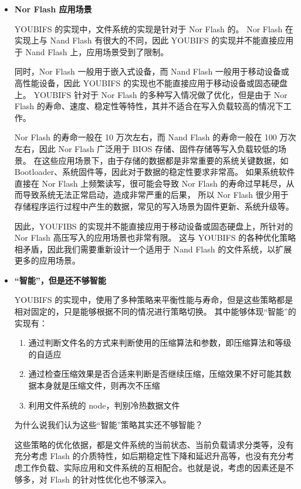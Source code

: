 \begin{itemize}
  \item {\bf{Nor Flash 应用场景}}
    
  YOUBIFS 的实现中，文件系统的实现是针对于 Nor Flash 的。
  Nor Flash 在实现上与 Nand Flash 有很大的不同，因此 YOUBIFS 的实现并不能直接应用于 Nand Flash 上，应用场景受到了限制。
  
  同时，Nor Flash 一般用于嵌入式设备，而 Nand Flash 一般用于移动设备或高性能设备，因此 YOUBIFS 的实现也不能直接应用于移动设备或固态硬盘上。
  YOUBIFS 针对于 Nor Flash 的多种写入情况做了优化，但是由于 Nor Flash 的寿命、速度、稳定性等特性，其并不适合在写入负载较高的情况下工作。

  Nor Flash 的寿命一般在 10 万次左右，而 Nand Flash 的寿命一般在 100 万次左右，因此 Nor Flash 广泛用于 BIOS 存储、固件存储等写入负载较低的场景。
  在这些应用场景下，由于存储的数据都是非常重要的系统关键数据，如 Bootloader、系统固件等，因此对于数据的稳定性要求非常高。
  如果系统软件直接在 Nor Flash 上频繁读写，很可能会导致 Nor Flash 的寿命过早耗尽，从而导致系统无法正常启动，造成非常严重的后果，
  所以 Nor Flash 很少用于存储程序运行过程中产生的数据，常见的写入场景为固件更新、系统升级等。

  因此，YOUFIBS 的实现并不能直接应用于移动设备或固态硬盘上，所针对的 Nor Flash 高压写入的应用场景也非常有限。
  这与 YOUBIFS 的各种优化策略相矛盾，因此我们需要重新设计一个适用于 Nand Flash 的文件系统，以扩展更多的应用场景。

  \item {\bf{“智能”，但是还不够智能}}

  YOUBIFS 的实现中，使用了多种策略来平衡性能与寿命，但是这些策略都是相对固定的，只是能够根据不同的情况进行策略切换。
  其中能够体现“智能”的实现有：

  \begin{enumerate}
    \item 通过判断文件名的方式来判断使用的压缩算法和参数，即压缩算法和等级的自适应
    \item 通过检查压缩效果是否合适来判断是否继续压缩，压缩效果不好可能其数据本身就是压缩文件，则再次不压缩
    \item 利用文件系统的 node，判别冷热数据文件
  \end{enumerate}

  为什么说我们认为这些“智能”策略其实还不够智能？
  
  这些策略的优化依据，都是文件系统的当前状态、当前负载请求分类等，没有充分考虑 Flash 的介质特性，如后期稳定性下降和延迟升高等，也没有充分考虑工作负载、实际应用和文件系统的互相配合。也就是说，考虑的因素还是不够多，对 Flash 的针对性优化也不够深入。


\end{itemize}
